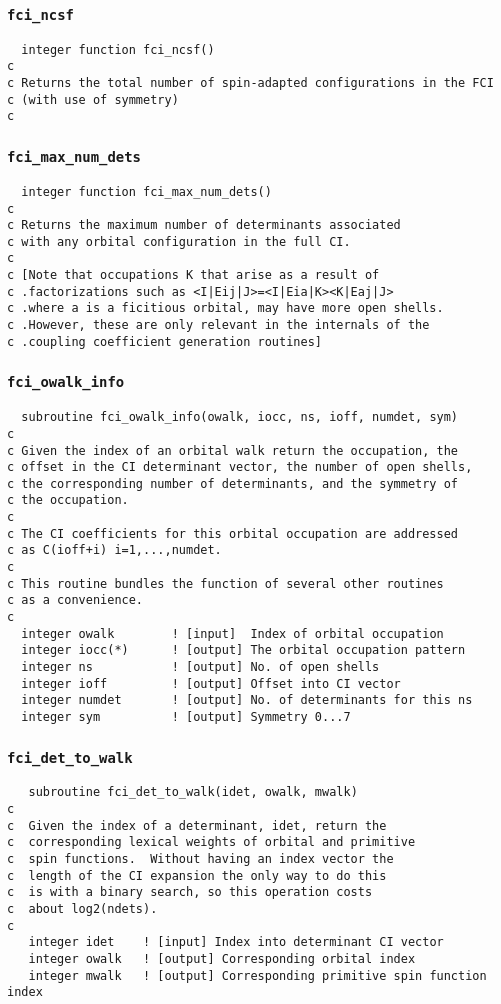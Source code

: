 \subsubsection{{\tt fci\_ncsf}}
\begin{verbatim}
  integer function fci_ncsf()
c
c Returns the total number of spin-adapted configurations in the FCI
c (with use of symmetry)
c
\end{verbatim}

\subsubsection{{\tt fci\_max\_num\_dets}}
\begin{verbatim}
  integer function fci_max_num_dets()
c
c Returns the maximum number of determinants associated
c with any orbital configuration in the full CI.
c
c [Note that occupations K that arise as a result of
c .factorizations such as <I|Eij|J>=<I|Eia|K><K|Eaj|J>
c .where a is a ficitious orbital, may have more open shells.  
c .However, these are only relevant in the internals of the 
c .coupling coefficient generation routines]
\end{verbatim}

\subsubsection{{\tt fci\_owalk\_info}}
\label{sec:fciowalkinfo}
\begin{verbatim}
  subroutine fci_owalk_info(owalk, iocc, ns, ioff, numdet, sym)
c     
c Given the index of an orbital walk return the occupation, the 
c offset in the CI determinant vector, the number of open shells,
c the corresponding number of determinants, and the symmetry of 
c the occupation.  
c  
c The CI coefficients for this orbital occupation are addressed
c as C(ioff+i) i=1,...,numdet.
c     
c This routine bundles the function of several other routines
c as a convenience.
c     
  integer owalk        ! [input]  Index of orbital occupation
  integer iocc(*)      ! [output] The orbital occupation pattern
  integer ns           ! [output] No. of open shells
  integer ioff         ! [output] Offset into CI vector
  integer numdet       ! [output] No. of determinants for this ns
  integer sym          ! [output] Symmetry 0...7
\end{verbatim}

\subsubsection{{\tt fci\_det\_to\_walk}}
\begin{verbatim}
   subroutine fci_det_to_walk(idet, owalk, mwalk)
c
c  Given the index of a determinant, idet, return the
c  corresponding lexical weights of orbital and primitive
c  spin functions.  Without having an index vector the
c  length of the CI expansion the only way to do this
c  is with a binary search, so this operation costs 
c  about log2(ndets).
c
   integer idet    ! [input] Index into determinant CI vector
   integer owalk   ! [output] Corresponding orbital index
   integer mwalk   ! [output] Corresponding primitive spin function index
\end{verbatim}

